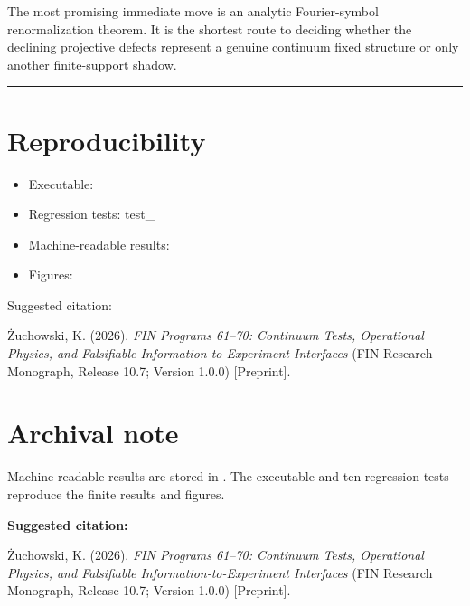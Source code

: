 \documentclass[11pt,a4paper,openany]{report}
\begin{document}
The most promising immediate move is an analytic Fourier-symbol renormalization theorem. It is the shortest route to deciding whether the declining projective defects represent a genuine continuum fixed structure or only another finite-support shadow.

\par\medskip\hrule\medskip

\chapter{Reproducibility}

\begin{itemize}
\item 
Executable: 

\item 
Regression tests: test\_

\item 
Machine-readable results: 

\item 
Figures: 

\end{itemize}

Suggested citation:

Żuchowski, K. (2026). \emph{FIN Programs 61–70: Continuum Tests, Operational Physics, and Falsifiable Information-to-Experiment Interfaces} (FIN Research Monograph, Release 10.7; Version 1.0.0) [Preprint].


\clearpage
\chapter*{Archival note}
Machine-readable results are stored in
. The
executable and ten regression tests reproduce the finite results and figures.

\medskip
\noindent\textbf{Suggested citation:}

\.Zuchowski, K. (2026). \emph{FIN Programs 61--70: Continuum Tests,
Operational Physics, and Falsifiable Information-to-Experiment Interfaces}
(FIN Research Monograph, Release 10.7; Version 1.0.0) [Preprint].
\end{document}
